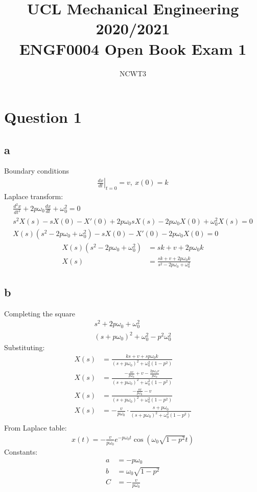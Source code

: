 \documentclass[11pt]{article}
\numberwithin{equation}{section}
\begin{document}
\title{\textbf{UCL Mechanical Engineering 2020/2021}\\ENGF0004 Open Book Exam 1}
\author{NCWT3}
\maketitle
\section{Question 1}
\subsection*{a}
Boundary conditions
\begin{gather}
  \left.\frac{dx}{dt}\right|_{t=0} = v, \ x(0) = k
\end{gather}
Laplace transform:
\begin{gather}
  \frac{d^2 x}{d t^2} + 2p\omega_0\frac{d x}{d t} + \omega_0^2 = 0\\
  s^2 X(s) - sX(0) - X'(0) + 2p\omega_0 s X(s) - 2p\omega_0 X(0) + \omega_0^2 X(s) = 0\\
  X(s) \left(s^2 - 2p\omega_0 + \omega_0^2\right) -s X(0) - X'(0)-2p\omega_0X(0) = 0
\end{gather}
\begin{align}
  X(s) \left(s^2 - 2p\omega_0 + \omega_0^2\right) &= sk + v + 2p\omega_0 k\\
  X(s) &= \frac{sk + v + 2p\omega_0 k}{s^2 - 2p\omega_0 + \omega_0^2}
\end{align}
\subsection*{b}
Completing the square
\begin{gather}
  s^2 + 2 p \omega_0 + \omega_0^2\\
  (s + p\omega_0)^2 + \omega_0^2 - p^2\omega_0^2
\end{gather}
Substituting:
\begin{align}
  X(s) &= \frac{ks + v + sp\omega_0 k}{(s + p\omega_0 )^2 + \omega_0^2(1-p^2)}\\
  X(s) &= \frac{-\frac{sv}{p\omega_0} + v -\frac{2p\omega_0 v}{p \omega_0}}{(s + p\omega_0 )^2 + \omega_0^2(1-p^2)}\\
  X(s) &= \frac{-\frac{sv}{p\omega_0} -v}{(s + p\omega_0 )^2 + \omega_0^2(1-p^2)}\\
  X(s) &= -\frac{v}{p\omega_0} \cdot \frac{s+ p \omega_0}{(s + p\omega_0 )^2 + \omega_0^2(1-p^2)}\\
\end{align}
From Laplace table:
\begin{gather}
  x(t) = -\frac{v}{p\omega_0} e^{-p\omega_0 t} \cos{\left(\omega_0 \sqrt{1-p^2} t\right)}
\end{gather}
Constants:
\begin{align}
  a &= - p\omega_0\\
  b &= \omega_0 \sqrt{1-p^2}\\
  C &= -\frac{v}{p\omega_0}
\end{align}
\end{document}
